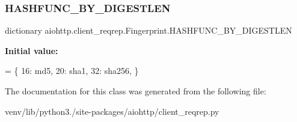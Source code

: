 \subsubsection{\texorpdfstring{H\+A\+S\+H\+F\+U\+N\+C\+\_\+\+B\+Y\+\_\+\+D\+I\+G\+E\+S\+T\+L\+EN}{HASHFUNC\_BY\_DIGESTLEN}}
{\footnotesize\ttfamily dictionary aiohttp.\+client\+\_\+reqrep.\+Fingerprint.\+H\+A\+S\+H\+F\+U\+N\+C\+\_\+\+B\+Y\+\_\+\+D\+I\+G\+E\+S\+T\+L\+EN\hspace{0.3cm}{\ttfamily [static]}}

{\bfseries Initial value\+:}
\begin{DoxyCode}
=  \{
        16: md5,
        20: sha1,
        32: sha256,
    \}
\end{DoxyCode}


The documentation for this class was generated from the following file\+:\begin{DoxyCompactItemize}
\item 
venv/lib/python3./site-\/packages/aiohttp/client\+\_\+reqrep.\+py\end{DoxyCompactItemize}
